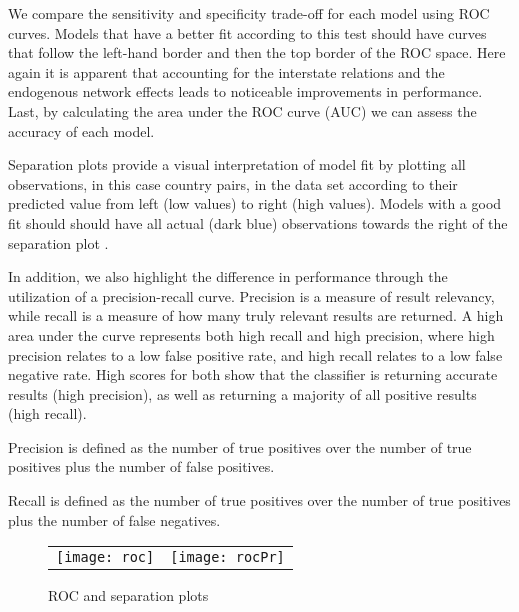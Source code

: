We compare the sensitivity and specificity trade-off for each model using ROC curves. Models that have a better fit according to this test should have curves that follow the left-hand border and then the top border of the ROC space. Here again it is apparent that accounting for the interstate relations and the endogenous network effects leads to noticeable improvements in performance. Last, by calculating the area under the ROC curve (AUC) we can assess the accuracy of each model.

Separation plots provide a visual interpretation of model fit by plotting all observations, in this case country pairs, in the data set according to their predicted value from left (low values) to right (high values). Models with a good fit should should have all actual (dark blue) observations towards the right of the separation plot \citep{greenhill:etal:2011}.

\citet{beger:2015}

In addition, we also highlight the difference in performance through the utilization of a precision-recall curve. Precision is a measure of result relevancy, while recall is a measure of how many truly relevant results are returned. A high area under the curve represents both high recall and high precision, where high precision relates to a low false positive rate, and high recall relates to a low false negative rate. High scores for both show that the classifier is returning accurate results (high precision), as well as returning a majority of all positive results (high recall). 

Precision is defined as the number of true positives over the number of true positives plus the number of false positives. 

Recall is defined as the number of true positives over the number of true positives plus the number of false negatives. 

\begin{figure}[ht]
	\centering
	\begin{tabular}{cc}
	\texttt{[image: roc]} & 
	\texttt{[image: rocPr]}	
	\end{tabular}
	\caption{ROC and separation plots}
	\label{fig:roc}
\end{figure}

% 